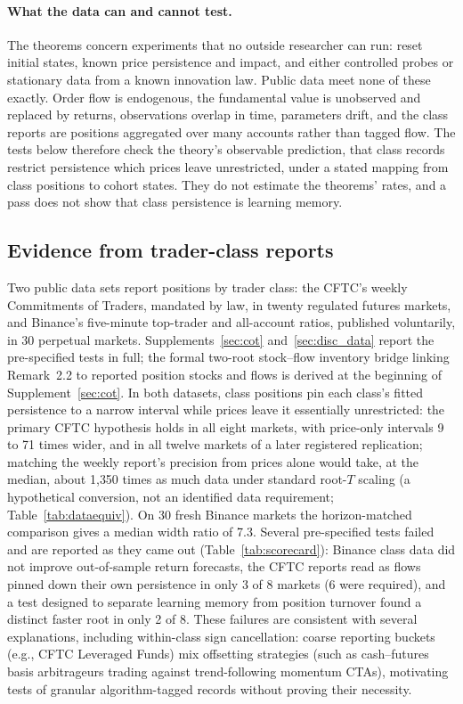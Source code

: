 \documentclass[12pt]{article}
\theoremstyle{definition}
\theoremstyle{remark}
\begin{document}
\paragraph{What the data can and cannot test.} The theorems concern experiments that no outside researcher can run: reset initial states, known price persistence and impact, and either controlled probes or stationary data from a known innovation law. Public data meet none of these exactly. Order flow is endogenous, the fundamental value is unobserved and replaced by returns, observations overlap in time, parameters drift, and the class reports are positions aggregated over many accounts rather than tagged flow. The tests below therefore check the theory's observable prediction, that class records restrict persistence which prices leave unrestricted, under a stated mapping from class positions to cohort states. They do not estimate the theorems' rates, and a pass does not show that class persistence is learning memory.

\subsection{Evidence from trader-class reports}
Two public data sets report positions by trader class: the CFTC's weekly Commitments of Traders, mandated by law, in twenty regulated futures markets, and Binance's five-minute top-trader and all-account ratios, published voluntarily, in 30 perpetual markets. Supplements~\ref{sec:cot} and~\ref{sec:disc_data} report the pre-specified tests in full; the formal two-root stock--flow inventory bridge linking Remark~2.2 to reported position stocks and flows is derived at the beginning of Supplement~\ref{sec:cot}. In both datasets, class positions pin each class's fitted persistence to a narrow interval while prices leave it essentially unrestricted: the primary CFTC hypothesis holds in all eight markets, with price-only intervals 9 to 71 times wider, and in all twelve markets of a later registered replication; matching the weekly report's precision from prices alone would take, at the median, about 1{,}350 times as much data under standard root-$T$ scaling (a hypothetical conversion, not an identified data requirement; Table~\ref{tab:dataequiv}). On 30 fresh Binance markets the horizon-matched comparison gives a median width ratio of 7.3. Several pre-specified tests failed and are reported as they came out (Table~\ref{tab:scorecard}): Binance class data did not improve out-of-sample return forecasts, the CFTC reports read as flows pinned down their own persistence in only 3 of 8 markets (6 were required), and a test designed to separate learning memory from position turnover found a distinct faster root in only 2 of 8. These failures are consistent with several explanations, including within-class sign cancellation: coarse reporting buckets (e.g., CFTC Leveraged Funds) mix offsetting strategies (such as cash--futures basis arbitrageurs trading against trend-following momentum CTAs), motivating tests of granular algorithm-tagged records without proving their necessity.
\end{document}
